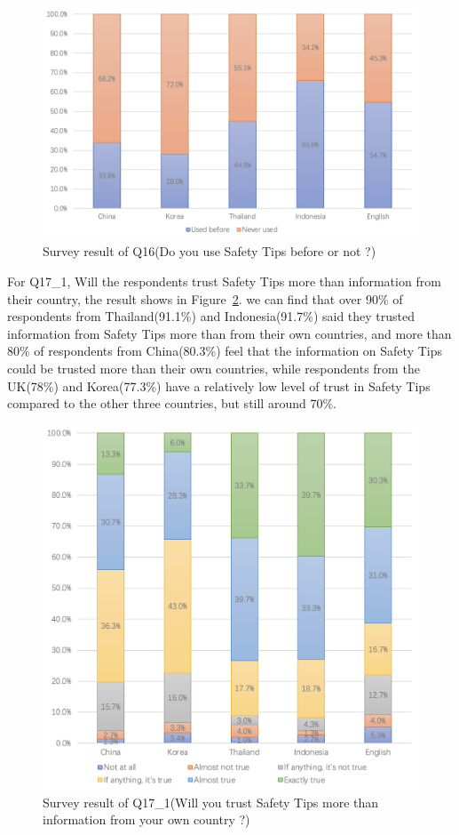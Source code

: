 \begin{figure}[h]
  \includegraphics[width=0.8\linewidth]{Figure/Figure14.jpg}
  \centering
  \caption[Survey result of Q16]{Survey result of Q16(Do you use Safety Tips before or not ?)}
  \label{fig14}
\end{figure}

For Q17\_1, Will the respondents trust Safety Tips more than information from their country, the result shows in Figure~\ref{fig15}. we can find that over 90\% of respondents from Thailand(91.1\%) and Indonesia(91.7\%) said they trusted information from Safety Tips more than from their own countries, and more than 80\% of respondents from China(80.3\%) feel that the information on Safety Tips could be trusted more than their own countries, while respondents from the UK(78\%) and Korea(77.3\%) have a relatively low level of trust in Safety Tips compared to the other three countries, but still around 70\%. 

\begin{figure}[h]
  \includegraphics[width=0.8\linewidth]{Figure/Figure15.jpg}
  \centering
  \caption[Survey result of Q17\_1]{Survey result of Q17\_1(Will you trust Safety Tips more than information from your own country ?)}
  \label{fig15}
\end{figure}

